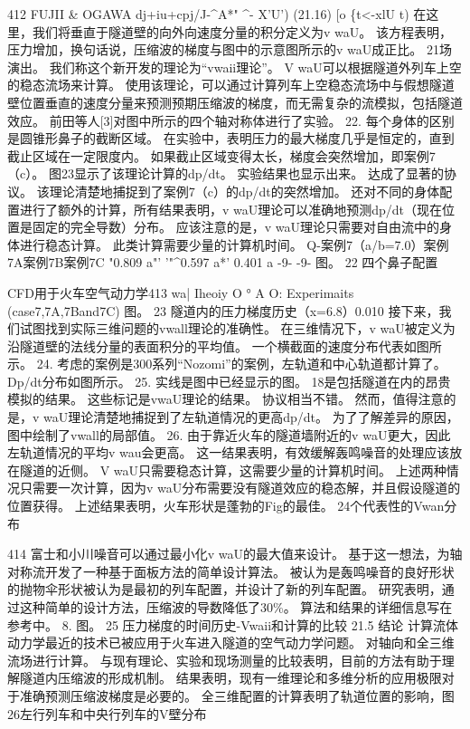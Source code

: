 \documentclass[UTF8,11pt,a4paper,openany,fontset=fandol]{ctexbook}
\begin{document}
412 FUJII \& OGAWA dj+iu+cpj/J-\textasciicircum{}A*" \textasciicircum{}- X'U') (21.16) [o \{t<-xlU t) 在这里，我们将垂直于隧道壁的向外向速度分量的积分定义为v waU。 该方程表明，压力增加，换句话说，压缩波的梯度与图中的示意图所示的v waU成正比。 21场演出。 我们称这个新开发的理论为“vwaii理论”。 V waU可以根据隧道外列车上空的稳态流场来计算。 使用该理论，可以通过计算列车上空稳态流场中与假想隧道壁位置垂直的速度分量来预测预期压缩波的梯度，而无需复杂的流模拟，包括隧道效应。 前田等人[3]对图中所示的四个轴对称体进行了实验。 22. 每个身体的区别是圆锥形鼻子的截断区域。 在实验中，表明压力的最大梯度几乎是恒定的，直到截止区域在一定限度内。 如果截止区域变得太长，梯度会突然增加，即案例7（c）。 图23显示了该理论计算的dp/dt。 实验结果也显示出来。 达成了显著的协议。 该理论清楚地捕捉到了案例7（c）的dp/dt的突然增加。 还对不同的身体配置进行了额外的计算，所有结果表明，v waU理论可以准确地预测dp/dt（现在位置是固定的完全导数）分布。 应该注意的是，v waU理论只需要对自由流中的身体进行稳态计算。 此类计算需要少量的计算机时间。 Q-案例7（a/b=7.0）案例7A案例7B案例7C "0.809 a"' '"\textasciicircum{}0.597 a*' 0.401 a -9- -9- 图。 22 四个鼻子配置

CFD用于火车空气动力学413 wa| Iheoiy O ° A O: Experimaits (case7,7A,7Band7C) 图。 23 隧道内的压力梯度历史（x=6.8）0.010 接下来，我们试图找到实际三维问题的vwall理论的准确性。 在三维情况下，v waU被定义为沿隧道壁的法线分量的表面积分的平均值。 一个横截面的速度分布代表如图所示。 24. 考虑的案例是300系列“Nozomi”的案例，左轨道和中心轨道都计算了。 Dp/dt分布如图所示。 25. 实线是图中已经显示的图。 18是包括隧道在内的昂贵模拟的结果。 这些标记是vwaU理论的结果。 协议相当不错。 然而，值得注意的是，v waU理论清楚地捕捉到了左轨道情况的更高dp/dt。 为了了解差异的原因，图中绘制了vwall的局部值。 26. 由于靠近火车的隧道墙附近的v waU更大，因此左轨道情况的平均v wau会更高。 这一结果表明，有效缓解轰鸣噪音的处理应该放在隧道的近侧。 V waU只需要稳态计算，这需要少量的计算机时间。 上述两种情况只需要一次计算，因为v waU分布需要没有隧道效应的稳态解，并且假设隧道的位置获得。 上述结果表明，火车形状是蓬勃的Fig的最佳。 24个代表性的Vwan分布

414 富士和小川噪音可以通过最小化v waU的最大值来设计。 基于这一想法，为轴对称流开发了一种基于面板方法的简单设计算法。 被认为是轰鸣噪音的良好形状的抛物伞形状被认为是最初的列车配置，并设计了新的列车配置。 研究表明，通过这种简单的设计方法，压缩波的导数降低了30\%。 算法和结果的详细信息写在参考中。 8. 图。 25 压力梯度的时间历史-Vwaii和计算的比较 21.5 结论 计算流体动力学最近的技术已被应用于火车进入隧道的空气动力学问题。 对轴向和全三维流场进行计算。 与现有理论、实验和现场测量的比较表明，目前的方法有助于理解隧道内压缩波的形成机制。 结果表明，现有一维理论和多维分析的应用极限对于准确预测压缩波梯度是必要的。 全三维配置的计算表明了轨道位置的影响，图26左行列车和中央行列车的V壁分布
\end{document}
